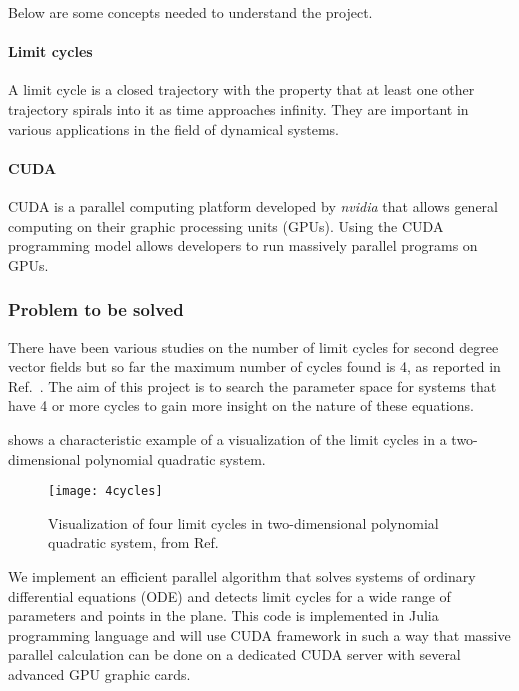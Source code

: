 Below are some concepts needed to understand the project.

\paragraph{Limit cycles}

A limit cycle is a closed trajectory with the property that at least one other
trajectory spirals into it as time approaches infinity. They are important in
various applications in the field of dynamical systems.

\paragraph{CUDA}
CUDA is a parallel computing platform developed by \emph{nvidia} that allows general
computing on their graphic processing units (GPUs). Using the CUDA programming
model allows developers to run massively parallel programs on GPUs.

\pagebreak
\subsubsection{Problem to be solved}

There have been various studies on the number of limit cycles for second degree
vector fields but so far the maximum number of cycles found is 4, as reported in
Ref.~\cite{kuznetsov_visualization_2013}. The aim of this project is to search
the parameter space for systems that have 4 or more cycles to gain more insight
on the nature of these equations.

 shows a characteristic example of a visualization of the
limit cycles in a two-dimensional polynomial quadratic system.

\begin{figure}[H]
    \centering
    \texttt{[image: 4cycles]}
    \caption{Visualization of four limit cycles in two-dimensional polynomial quadratic system, from Ref.~\cite{kuznetsov_visualization_2013}
    }%
    \label{fig:kuznetsov}
\end{figure}

We implement an efficient parallel algorithm that solves systems of ordinary differential equations (ODE) and detects limit cycles for a wide range of parameters and points in the plane. This code is implemented in Julia programming language and will use CUDA framework in such a way that massive parallel calculation can be done on a dedicated CUDA server with several
advanced GPU graphic cards.


